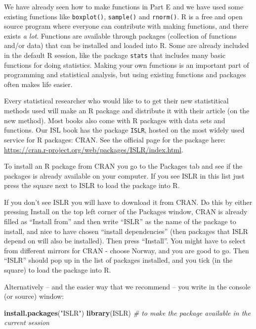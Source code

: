\documentclass[]{article}
\newenvironment{Shaded}{\begin{snugshade}}{\end{snugshade}}
\newcommand{\KeywordTok}[1]{\textcolor[rgb]{0.13,0.29,0.53}{\textbf{#1}}}
\newcommand{\StringTok}[1]{\textcolor[rgb]{0.31,0.60,0.02}{#1}}
\newcommand{\CommentTok}[1]{\textcolor[rgb]{0.56,0.35,0.01}{\textit{#1}}}
\newcommand{\NormalTok}[1]{#1}
\begin{document}
We have already seen how to make functions in Part E and we have used
some existing functions like \texttt{boxplot()}, \texttt{sample()} and
\texttt{rnorm()}. R is a free and open source program where everyone can
contribute with making functions, and there exists \emph{a lot}.
Functions are available through packages (collection of functions and/or
data) that can be installed and loaded into R. Some are already included
in the default R session, like the package \texttt{stats} that includes
many basic functions for doing statistics. Making your own functions is
an important part of programming and statistical analysis, but using
existing functions and packages often makes life easier.

Every statistical researcher who would like to to get their new
statistitical methods used will make an R package and distribute it with
their article (on the new method). Most books also come with R packages
with data sets and functions. Our ISL book has the package
\texttt{ISLR}, hosted on the most widely used service for R packages:
CRAN. See the official page for the package here:
\url{https://cran.r-project.org/web/packages/ISLR/index.html}.

To install an R package from CRAN you go to the Packages tab and see if
the packages is already available on your computer. If you see ISLR in
this list just press the square next to ISLR to load the package into R.

If you don't see ISLR you will have to download it from CRAN. Do this by
either pressing Install on the top left corner of the Packages window,
CRAN is already filled as ``Install from'' and then write ``ISLR'' as
the name of the package to install, and nice to have chosen ``install
dependencies'' (then packages that ISLR depend on will also be
installed). Then press ``Install''. You might have to select from
different mirrors for CRAN - choose Norway, and you are good to go. Then
``ISLR'' should pop up in the list of packages installed, and you tick
(in the square) to load the package into R.

Alternatively -- and the easier way that we recommend -- you write in
the console (or source) window:

\begin{Shaded}
\begin{Highlighting}[]
\KeywordTok{install.packages}\NormalTok{(}\StringTok{"ISLR"}\NormalTok{)}
\KeywordTok{library}\NormalTok{(ISLR)  }\CommentTok{# to make the package available in the current session}
\end{Highlighting}
\end{Shaded}
\end{document}
